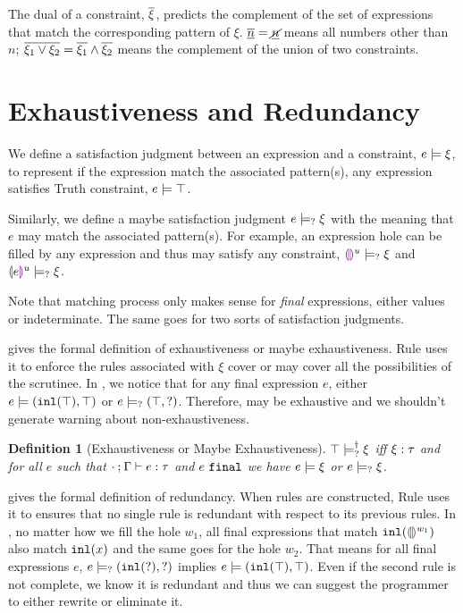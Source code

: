 \documentclass[acmsmall,screen,review,nonacm]{acmart}
\theoremstyle{slplain}
\numberwithin{thm}{section}
\newtheorem{defn}[thm]{Definition}
\begin{document}
The dual of a constraint, $\overline{\xi}$, predicts the complement of the set of expressions that match the corresponding pattern of $\xi$.
\eg $\overline{\underline{n}}=\underline{\cancel{n}}$ means all numbers other than $n$;
$\overline{\xi_1 \vee \xi_2}=\overline{\xi_1} \wedge \overline{\xi_2}$ means the complement of the union of two constraints.




\section{Exhaustiveness and Redundancy}
\label{sec:exhaustiveness-redundancy}
We define a satisfaction judgment between an expression and a constraint, $e \models \xi$, to represent if the expression match the associated pattern(s),
\eg any expression satisfies Truth constraint, $e \models \top$.

Similarly, we define a maybe satisfaction judgment $e \models_{?} \xi$ with the meaning that $e$ may match the associated pattern(s). For example, an expression hole can be filled by any expression and thus may satisfy any constraint, \ie $\textcolor{violet}{\llparenthesis}\textcolor{violet}{\rrparenthesis}^{u} \models_{?} \xi$ and $\textcolor{violet}{\llparenthesis} e\textcolor{violet}{\rrparenthesis}^{u} \models_{?} \xi$.

Note that matching process only makes sense for \emph{final} expressions, \ie either values or indeterminate. The same goes for two sorts of satisfaction judgments.

 gives the formal definition of exhaustiveness or maybe exhaustiveness.
Rule \TMatchZPre uses it to enforce the rules associated with $\xi$ cover or may cover all the possibilities of the scrutinee.
In , we notice that for any final expression $e$, either 
$e \models (\mathtt{inl}(\top) , \top)$ or $e \models_{?} (\top , \mathtt{?})$.
Therefore,  may be exhaustive and we shouldn't generate warning about non-exhaustiveness.

\begin{defn}[Exhaustiveness or Maybe Exhaustiveness]
  \label{defn:exhaustiveness}
  $\top \models_{?}^{\dag} \xi$ iff $\xi : \tau$ and for all $e$ such that $\cdot \mathbin{;} \Gamma \vdash e : \tau$ and $e ~\mathtt{final}$ we have $e \models \xi$ or $e \models_{?} \xi$.
\end{defn}

 gives the formal definition of redundancy. When rules are constructed, Rule \TRules uses it to ensures that no single rule is redundant with respect to its previous rules.
In , no matter how we fill the hole $w_1$, all final expressions that match $\mathtt{inl}(\textcolor{violet}{\llparenthesis}\textcolor{violet}{\rrparenthesis}^{w_1})$ also match $\mathtt{inl}(x)$ and the same goes for the hole $w_2$.
That means for all final expressions $e$,
$e \models_{?} (\mathtt{inl}(\mathtt{?}) , \mathtt{?})$ implies $e \models (\mathtt{inl}(\top) , \top)$.
Even if the second rule is not complete, we know it is redundant and thus we can suggest the programmer to either rewrite or eliminate it.
\end{document}
